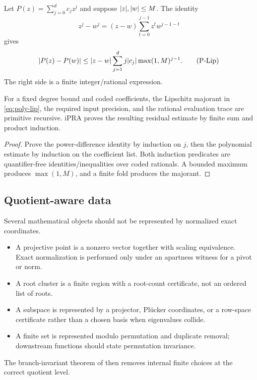 Let $P(z)=\sum_{j=0}^d c_jz^j$ and suppose $\lvert z\rvert,\lvert w\rvert\le M$.  The identity
\[
 z^j-w^j=(z-w)\sum_{t=0}^{j-1}z^tw^{j-1-t}
\]
gives
\[
 \lvert P(z)-P(w)\rvert
 \le \lvert z-w\rvert\sum_{j=1}^d j\lvert c_j\rvert\max(1,M)^{j-1}.
 \tag{P-Lip}\label{eq:poly-lip}
\]
The right side is a finite integer/rational expression.

\begin{lemma}
\label{lem:poly-observation}
For a fixed degree bound and coded coefficients, the Lipschitz majorant in \eqref{eq:poly-lip}, the required input precision, and the rational evaluation trace are primitive recursive.  iPRA proves the resulting residual estimate by finite sum and product induction.
\end{lemma}

\begin{proof}
Prove the power-difference identity by induction on $j$, then the polynomial estimate by induction on the coefficient list.  Both induction predicates are quantifier-free identities/inequalities over coded rationals.  A bounded maximum produces $\max(1,M)$, and a finite fold produces the majorant.
\end{proof}

\subsection{Quotient-aware data}

Several mathematical objects should not be represented by normalized exact coordinates.

\begin{itemize}
\item A projective point is a nonzero vector together with scaling equivalence.  Exact normalization is performed only under an apartness witness for a pivot or norm.
\item A root cluster is a finite region with a root-count certificate, not an ordered list of roots.
\item A subspace is represented by a projector, Pl\"ucker coordinates, or a row-space certificate rather than a chosen basis when eigenvalues collide.
\item A finite set is represented modulo permutation and duplicate removal; downstream functions should state permutation invariance.
\end{itemize}
The branch-invariant theorem of  then removes internal finite choices at the correct quotient level.

